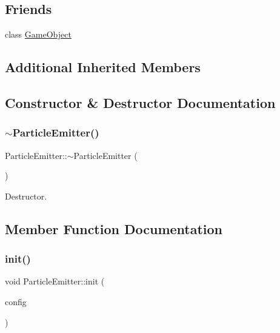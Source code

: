 \subsection*{Friends}
\begin{DoxyCompactItemize}
\item 
class \hyperlink{class_mason_1_1_particle_emitter_a00df87c957d8f7ee0fc51f07a0542f4a}{Game\+Object}
\end{DoxyCompactItemize}
\subsection*{Additional Inherited Members}


\subsection{Constructor \& Destructor Documentation}
\hypertarget{class_mason_1_1_particle_emitter_a6f4952f7555ede99d74d42b30c80f3e2}{}\label{class_mason_1_1_particle_emitter_a6f4952f7555ede99d74d42b30c80f3e2} 
\subsubsection{\texorpdfstring{$\sim$\+Particle\+Emitter()}{~ParticleEmitter()}}
{\footnotesize\ttfamily Particle\+Emitter\+::$\sim$\+Particle\+Emitter (\begin{DoxyParamCaption}{ }\end{DoxyParamCaption})}



Destructor. 



\subsection{Member Function Documentation}
\hypertarget{class_mason_1_1_particle_emitter_a31dbabbe960449bcc71ac94f0421a07f}{}\label{class_mason_1_1_particle_emitter_a31dbabbe960449bcc71ac94f0421a07f} 
\subsubsection{\texorpdfstring{init()}{init()}}
{\footnotesize\ttfamily void Particle\+Emitter\+::init (\begin{DoxyParamCaption}\item[{\hyperlink{struct_mason_1_1_particle_emitter_config}{Particle\+Emitter\+Config}}]{config }\end{DoxyParamCaption})}



